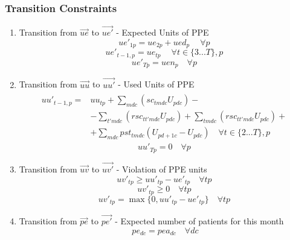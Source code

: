 \documentclass{article}
\begin{document}
\subsubsection{Transition Constraints}

\begin{enumerate}

	\item Transition from $\vec{ue}$ to $\vec{ue'}$ - Expected Units of PPE
		\begin{equation}  
			ue'_{1p} = ue_{2p} + ued_{p}\ \quad \forall p 
		\end{equation} 
		\begin{equation}  
			ue'_{t-1,p} = ue_{tp}\ \quad \forall t \in \{3...T\}, p
		 \end{equation} 
		\begin{equation}  
			ue'_{Tp} = uen_{p} \quad \forall p 
		\end{equation} 
	
	\item Transition from $\vec{uu}$ to $\vec{uu'}$ - Used Units of PPE		
		\begin{align} \begin{split}  
			uu'_{t-1,p} = &  uu	_{tp} + \sum_{mdc} ( sc_{tmdc} U_{pdc} ) - \\ 
								&	- \sum_{t'mdc} (rsc_{tt'mdc} U_{pdc}) + \sum_{tmdc} (rsc_{tt'mdc} U_{pdc}) + \\ 
								& 	+ \sum_{mdc} pst_{tmdc} (U_{pd+1c} - U_{pdc})  \quad \forall t \in \{2...T\}, p  
		\end{split} \end{align}
		\begin{equation}  
			uu'_{Tp} = 0 \quad \forall p 
		\end{equation} 
		
	\item Transition from $\vec{uv}$ to $\vec{uv'}$ - Violation of PPE units
	\begin{equation}
		uv'_{tp} \ge uu'_{tp} - ue'_{tp} \quad \forall tp
	\end{equation}
	\begin{equation}
		uv'_{tp} \ge 0 \quad \forall tp
	\end{equation}
	\begin{equation}
		uv'_{tp} = \max \{0, uu'_{tp} - ue'_{tp} \} \quad \forall tp
	\end{equation}

	\item Transition from $\vec{pe}$ to $\vec{pe'}$ - Expected number of patients for this month
		\begin{equation} 
			\ pe_{dc} = pea_{dc} \quad \forall dc 
		\end{equation} 


\end{enumerate}
\end{document}
